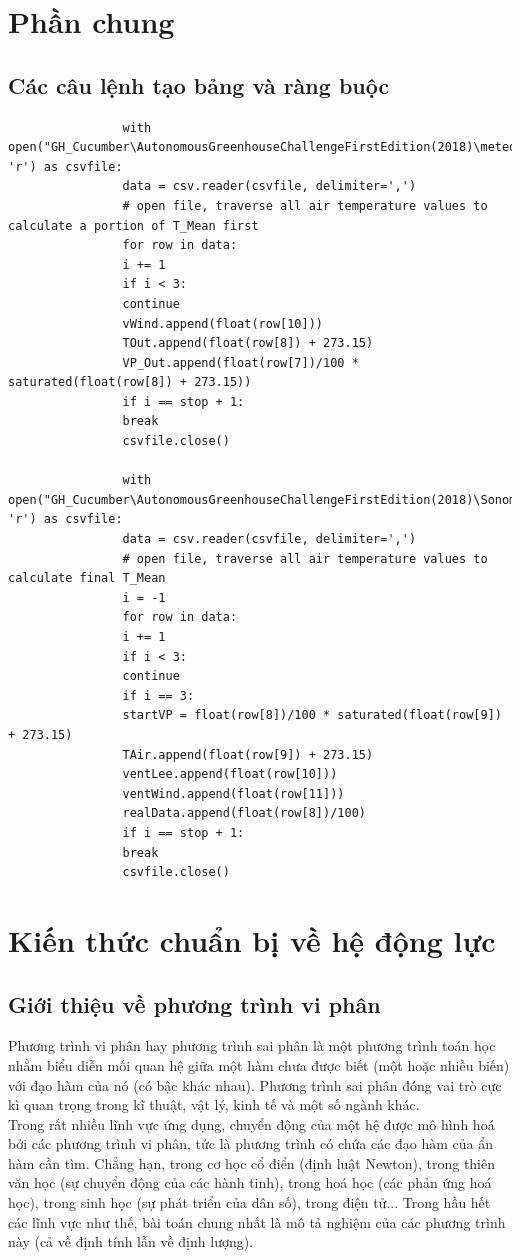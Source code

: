 \documentclass[13pt,a4paper]{article}
\begin{document}
	
	\newpage
	\tableofcontents
	\newpage
	
	
	\section{Phần chung}
		\subsection{Các câu lệnh tạo bảng và ràng buộc}
			\begin{lstlisting}
				with open("GH_Cucumber\AutonomousGreenhouseChallengeFirstEdition(2018)\meteo.csv", 'r') as csvfile:
				data = csv.reader(csvfile, delimiter=',')
				# open file, traverse all air temperature values to calculate a portion of T_Mean first
				for row in data:
				i += 1
				if i < 3: 
				continue
				vWind.append(float(row[10]))
				TOut.append(float(row[8]) + 273.15)
				VP_Out.append(float(row[7])/100 * saturated(float(row[8]) + 273.15))
				if i == stop + 1: 
				break
				csvfile.close()
				
				with open("GH_Cucumber\AutonomousGreenhouseChallengeFirstEdition(2018)\Sonoma\Greenhouse_climate.csv", 'r') as csvfile:
				data = csv.reader(csvfile, delimiter=',')
				# open file, traverse all air temperature values to calculate final T_Mean
				i = -1
				for row in data:
				i += 1
				if i < 3: 
				continue
				if i == 3: 
				startVP = float(row[8])/100 * saturated(float(row[9]) + 273.15)
				TAir.append(float(row[9]) + 273.15)
				ventLee.append(float(row[10]))
				ventWind.append(float(row[11]))
				realData.append(float(row[8])/100)
				if i == stop + 1:
				break
				csvfile.close()
			\end{lstlisting}
		
	\section{Kiến thức chuẩn bị về hệ động lực}
		\subsection{Giới thiệu về phương trình vi phân}
			Phương trình vi phân hay phương trình sai phân là một phương trình toán học nhằm biểu diễn mối quan hệ giữa một hàm chưa được biết (một hoặc nhiều biến) với đạo hàm của nó (có bậc khác nhau). Phương trình sai phân đóng vai trò cực kì quan trọng trong kĩ thuật, vật lý, kinh tế và một số ngành khác. \\
			Trong rất nhiều lĩnh vực ứng dụng, chuyển động của một hệ được mô hình hoá bởi các phương trình vi phân, tức là phương trình có chứa các đạo hàm của ẩn hàm cần tìm. Chẳng hạn, trong cơ học cổ điển (định luật Newton), trong thiên văn học (sự chuyển động của các hành tinh), trong hoá học (các phản ứng hoá học), trong sinh học (sự phát triển của dân số), trong điện tử... Trong hầu hết các lĩnh vực như thế, bài toán chung nhất là mô tả nghiệm của các phương trình này (cả về định tính lẫn về định lượng).
\end{document}

